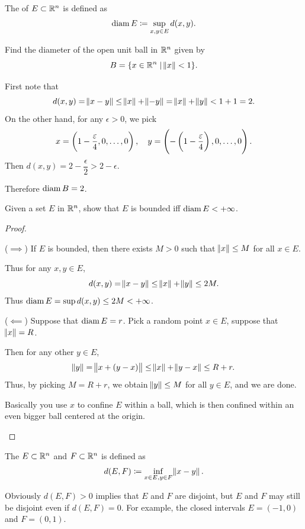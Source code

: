 \begin{definition}
The  of $E\subset\mathbb R^n$ is defined as
\[ \operatorname{diam} E\coloneqq\sup_{x,y\in E}d(x,y). \]
\end{definition}

\begin{exercise}
Find the diameter of the open unit ball in $\mathbb R^n$ given by
\[ B=\{x\in\mathbb R^n \mid \norm{x}<1\}. \]
\end{exercise}

\begin{solution}
First note that
\[ d(x,y)=\norm{x-y}\le\norm{x}+\norm{-y}=\norm{x}+\norm{y}<1+1=2. \]
On the other hand, for any $\epsilon>0$, we pick
\[ x=\left(1-\frac{\varepsilon}{4},0,\dots,0\right), \quad y=\left(-\left(1-\frac{\varepsilon}{4}\right),0,\dots,0\right). \]
Then $d(x,y)=2-\dfrac{\epsilon}{2}>2-\epsilon$.

Therefore $\operatorname{diam} B = 2$.
\end{solution}

\begin{exercise}
Given a set $E$ in $\mathbb R^n$, show that $E$ is bounded iff $\operatorname{diam} E<+\infty$.
\end{exercise}
\begin{proof} \

($\implies$) If $E$ is bounded, then there exists $M>0$ such that $\norm{x}\le M$ for all $x \in E$.

Thus for any $x,y \in E$,
\[ d(x,y)=\norm{x-y}\le\norm{x}+\norm{y}\le2M. \]
Thus $\operatorname{diam} E = \sup d(x,y) \le 2M<+\infty$.

($\impliedby$) Suppose that $\operatorname{diam} E=r$. Pick a random point $x \in E$, suppose that $\norm{x}=R$.

Then for any other $y \in E$,
\[ \norm{y}=\norm{x+(y-x)}\le\norm{x}+\norm{y-x}\le R+r. \]
Thus, by picking $M=R+r$, we obtain $\norm{y}\le M$ for all $y \in E$, and we are done.

\begin{remark}
Basically you use $x$ to confine $E$ within a ball, which is then confined within an even bigger ball centered at the origin.
\end{remark}
\end{proof}

\begin{definition}
The  $E\subset\mathbb R^n$ and $F\subset\mathbb R^n$ is defined as
\[ d(E,F)\coloneqq\inf_{x\in E,y\in F}\norm{x-y}. \]
\end{definition}

Obviously $d(E,F)>0$ implies that $E$ and $F$ are disjoint, but $E$ and $F$ may still be disjoint even if $d(E,F)=0$. For example, the closed intervals $E=(-1,0)$ and $F=(0,1)$.

